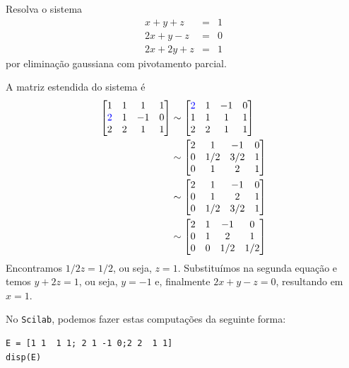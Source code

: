 \begin{ex} Resolva o sistema
\begin{eqnarray*}
  x+y+z  &=& 1\\
  2x+y-z &=& 0\\
  2x+2y+z &=& 1
\end{eqnarray*}
por eliminação gaussiana com pivotamento parcial.
\end{ex}
\begin{sol}
A matriz estendida do sistema é
\begin{equation*}
  \begin{split}
    \begin{bmatrix}
      1 &1&  1&1\\
      {\color{blue}{2}} &1& -1&0\\
      2 & 2 &1&1
    \end{bmatrix}
    &\sim
    \begin{bmatrix}
      {\color{blue}{2}} &1& -1&0\\
      1 &1&  1&1\\
      2 &2&  1&1
    \end{bmatrix}\\ 
    &\sim
    \begin{bmatrix}
      2 &1& -1&0\\
      0 &1/2& 3/2&1\\
      0 & 1 &2&1
    \end{bmatrix}\\
    &\sim
    \begin{bmatrix}
      2 &1& -1&0\\
      0 & 1 &2&1\\
      0 &1/2& 3/2&1
    \end{bmatrix}\\
    &\sim
    \begin{bmatrix}
      2 &1& -1&0\\
      0 & 1 &2&1\\
      0 &0& 1/2&1/2
    \end{bmatrix}    
  \end{split}
\end{equation*}
Encontramos $1/2z=1/2$, ou seja, $z=1$. Substituímos na segunda equação e temos $y+2z=1$, ou seja, $y=-1$ e, finalmente $2x+y-z=0$, resultando em $x=1$.

\ifisscilab
No \verb+Scilab+, podemos fazer estas computações da seguinte forma:
\begin{verbatim}
E = [1 1  1 1; 2 1 -1 0;2 2  1 1]
disp(E)


\end{verbatim}
\end{sol}

